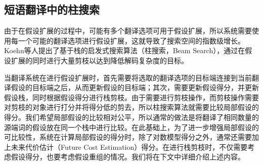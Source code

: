 \documentclass[master, winfont]{njuthesis}
\begin{document}

\subsection{短语翻译中的柱搜索}
由于在假设扩展的过程中，可能有多个翻译选项可用于假设扩展，所以系统需要使用每一个可能的翻译选项进行假设扩展，这就导致了搜索空间的指数级增长。Koehn等人提出了基于栈的启发式搜索算法（柱搜索，Beam Search），通过在假设扩展的同时进行大量剪枝以达到降低解码复杂度的目标。

当翻译系统在进行假设扩展时，首先需要将选取的翻译选项的目标端连接到当前翻译假设的目标端之后，从而更新假设的目标端；其次，需要更新假设得分，并更新假设栈，同时根据假设得分进行栈剪枝。由于需要进行剪枝操作，而剪枝操作需要对剪枝的对象进行打分并将得分低的剪去，所以柱搜索算法就需要比较局部假设的得分。我们希望局部假设的比较相对公平，所以通常的做法是将翻译了相同数量的源端词的假设放在同一个栈中进行比较。在此基础上，为了进一步增强局部假设的可比较性，系统在计算局部假设的得分时，除了对数模型得分之外，通常还需要加上未来代价估计（Future Cost Estimation）得分。在进行栈剪枝时，不仅需要考虑假设得分，也要考虑假设重组的情况。我们将在下文中详细介绍上述内容。
\end{document}
